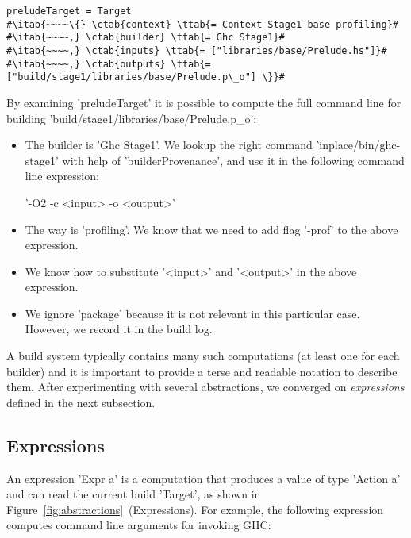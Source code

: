 \begin{lstlisting}
preludeTarget = Target
#\itab{~~~~\{} \ctab{context} \ttab{= Context Stage1 base profiling}#
#\itab{~~~~,} \ctab{builder} \ttab{= Ghc Stage1}#
#\itab{~~~~,} \ctab{inputs} \ttab{= ["libraries/base/Prelude.hs"]}#
#\itab{~~~~,} \ctab{outputs} \ttab{= ["build/stage1/libraries/base/Prelude.p\_o"] \}}#
\end{lstlisting}

\noindent By examining \lst'preludeTarget' it is possible to compute the full
command line for building \lst'build/stage1/libraries/base/Prelude.p_o':
\begin{itemize}
  \item The builder is \lst'Ghc Stage1'. We lookup the right command
  \lst'inplace/bin/ghc-stage1' with help of \lst'builderProvenance', and use it
  in the following command line expression:\vspace{1mm}\\
  \centerline{\!\!\!\!\!\lst'-O2 -c <input> -o <output>'}
  \item The way is \lst'profiling'. We know that we need to add
  flag \lst'-prof' to the above expression.
  \item We know how to substitute \lst'<input>' and \lst'<output>' in the
  above expression.
  \item We ignore \lst'package' because it is not relevant in this particular
  case. However, we record it in the build log.
\end{itemize}

\noindent A build system typically contains many such computations (at least one
for each builder) and it is important to provide a terse and readable notation to
describe them. After experimenting with several abstractions, we converged on
\emph{expressions} defined in the next subsection.

\subsection{Expressions\label{sec:expressions}}

An expression \lst'Expr a' is a computation that produces a value of type
\lst'Action a' and can read the current build \lst'Target', as shown in
Figure~\ref{fig:abstractions}~(Expressions). For example,
the following expression computes command line arguments for invoking GHC:

\newcommand{\altab}[1]{\hspace{.05\textwidth}\rlap{#1}}

